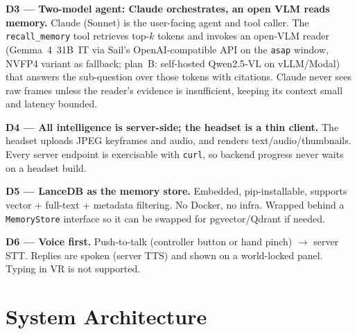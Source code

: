 \documentclass[11pt,a4paper]{article}
\begin{document}
\begin{decision}
\textbf{D3 --- Two-model agent: Claude orchestrates, an open VLM reads memory.}
Claude (Sonnet) is the user-facing agent and tool caller. The \texttt{recall\_memory} tool retrieves top-$k$ tokens and invokes an open-VLM reader (Gemma~4~31B~IT via Sail's OpenAI-compatible API on the \texttt{asap} window, NVFP4 variant as fallback; plan~B: self-hosted Qwen2.5-VL on vLLM/Modal) that answers the sub-question over those tokens with citations. Claude never sees raw frames unless the reader's evidence is insufficient, keeping its context small and latency bounded.
\end{decision}

\begin{decision}
\textbf{D4 --- All intelligence is server-side; the headset is a thin client.}
The headset uploads JPEG keyframes and audio, and renders text/audio/thumbnails. Every server endpoint is exercisable with \texttt{curl}, so backend progress never waits on a headset build.
\end{decision}

\begin{decision}
\textbf{D5 --- LanceDB as the memory store.}
Embedded, pip-installable, supports vector + full-text + metadata filtering. No Docker, no infra. Wrapped behind a \texttt{MemoryStore} interface so it can be swapped for pgvector/Qdrant if needed.
\end{decision}

\begin{decision}
\textbf{D6 --- Voice first.}
Push-to-talk (controller button or hand pinch) $\rightarrow$ server STT. Replies are spoken (server TTS) and shown on a world-locked panel. Typing in VR is not supported.
\end{decision}

\section{System Architecture}
\end{document}
